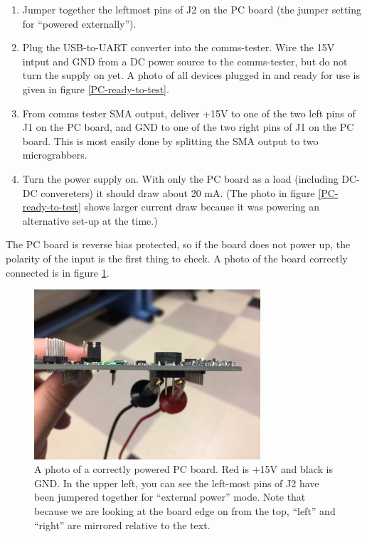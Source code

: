 \documentclass[letter,12pt]{article}
\begin{document}
\begin{enumerate}
\item Jumper together the leftmost pins of J2 on the PC board (the jumper setting for ``powered externally'').
\item Plug the USB-to-UART converter into the comms-tester. Wire the 15V intput and GND from a DC power source to the comms-tester, but do not turn the supply on yet. A photo of all devices plugged in and ready for use is given in figure \ref{PC-ready-to-test}.
\item From comms tester SMA output, deliver +15V to one of the two left pins of J1 on the PC board, and GND to one of the two right pins of J1 on the PC board. This is most easily done by splitting the SMA output to two micrograbbers.
\item Turn the power supply on. With only the PC board as a load (including DC-DC convereters) it should draw about 20 mA. (The photo in figure
\ref{PC-ready-to-test} shows larger current draw because it was powering an alternative set-up at the time.)
\end{enumerate}

The PC board is reverse bias protected, so if the board does not power up, the polarity of the input is the first thing to check. A photo of the board correctly connected is in figure \ref{correct-power-PC}. 

\begin{figure}
\begin{centering}
\includegraphics[width=0.75\textwidth]{photos/jumper-connection.jpg}
\par\end{centering}
\caption{A photo of a correctly powered PC board. Red is +15V and black is GND. In the upper left, you can see the left-most pins of J2 have been jumpered together for ``external power'' mode. Note that because we are looking at the board edge on from the top, ``left'' and ``right'' are mirrored relative to the text.}
\label{correct-power-PC}
\end{figure}
\end{document}
